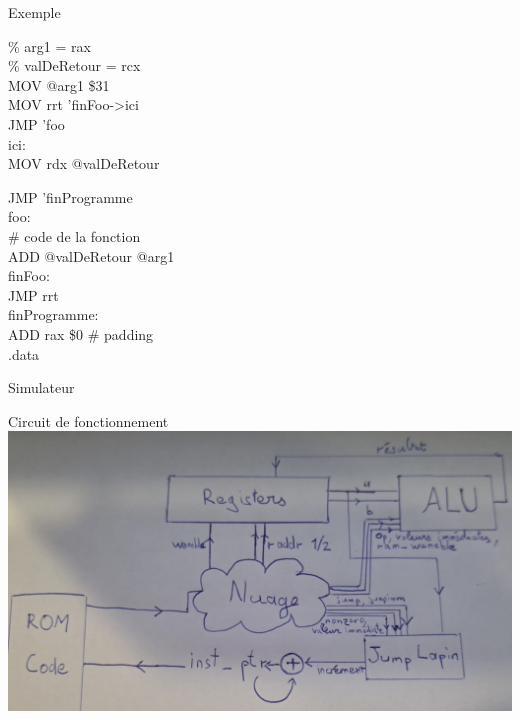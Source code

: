 \documentclass[12pt]{beamer}
\begin{document}
\begin{frame}{Exemple}

    \begin{minipage}[t]{0.48\linewidth}

\% arg1 = rax\\
\% valDeRetour = rcx\\


MOV @arg1 \$31\\
MOV rrt 'finFoo->ici\\
JMP 'foo\\
ici:\\
MOV rdx @valDeRetour\\

    \end{minipage}\hfill
    \begin{minipage}[t]{0.48\linewidth}
JMP 'finProgramme\\

foo:\\
\# code de la fonction\\
ADD @valDeRetour @arg1\\
finFoo:\\
JMP rrt\\


finProgramme:\\
ADD rax \$0  \# padding\\

.data
        \end{minipage}

\end{frame}

\begin{frame}{Simulateur}

\end{frame}

\begin{frame}{Circuit de fonctionnement}
    \includegraphics[scale=0.2]{Schema_structure.jpg}
\end{frame}
\end{document}
